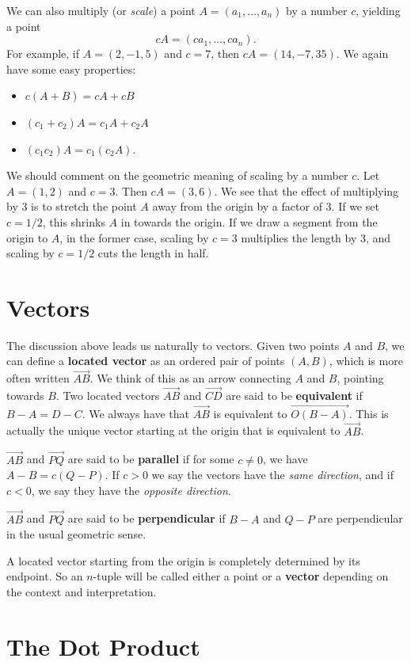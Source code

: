 \documentclass{article}
\begin{document}
We can also multiply (or \emph{scale}) a point $A=(a_1,\ldots,a_n)$ by a number $c$, yielding a point
\[cA = (ca_1, \ldots, ca_n).\]
For example, if $A=(2,-1,5)$ and $c=7$, then $cA=(14,-7,35)$.
We again have some easy properties:
\begin{itemize}
    \item $c(A+B)=cA + cB$
    \item $(c_1 + c_2)A = c_1 A + c_2 A$
    \item $(c_1 c_2)A = c_1(c_2 A)$.
\end{itemize}
We should comment on the geometric meaning of scaling by a number $c$. 
Let $A=(1,2)$ and $c=3$. Then $cA=(3,6)$. We see that the effect of multiplying by $3$ is to
stretch the point $A$ away from the origin by a factor of $3$. If we set $c=1/2$, this 
shrinks $A$ in towards the origin. If we draw a segment from the origin to $A$, in the former case,
scaling by $c=3$ multiplies the length by $3$, and scaling by $c=1/2$ cuts the length in half.

\section*{Vectors}
The discussion above leads us naturally to vectors. Given two points $A$ and $B$,
we can define a \textbf{located vector} as an ordered pair of points $(A,B)$, which is more
often written $\overrightarrow{AB}$. We think of this as an arrow connecting $A$ and $B$,
pointing towards $B$. Two located vectors $\overrightarrow{AB}$ and $\overrightarrow{CD}$
are said to be \textbf{equivalent} if $B-A=D-C$. We always have that
$\overrightarrow{AB}$ is equivalent to $\overrightarrow{O(B-A)}$. This is actually the unique
vector starting at the origin that is equivalent to $\overrightarrow{AB}$.

$\overrightarrow{AB}$ and $\overrightarrow{PQ}$ are said to be \textbf{parallel} if 
for some $c\neq 0$, we have $A-B = c(Q-P)$. If $c>0$ we say the vectors have the \emph{same direction},
and if $c<0$, we say they have the \emph{opposite direction}. 

$\overrightarrow{AB}$ and $\overrightarrow{PQ}$ are said to be \textbf{perpendicular} if 
$B - A$ and $Q - P$ are perpendicular in the usual geometric sense.

A located vector starting from the origin is completely determined by its
endpoint. So an $n$-tuple will be called either a point or a \textbf{vector}
depending on the context and interpretation. 

\section*{The Dot Product}
\end{document}
